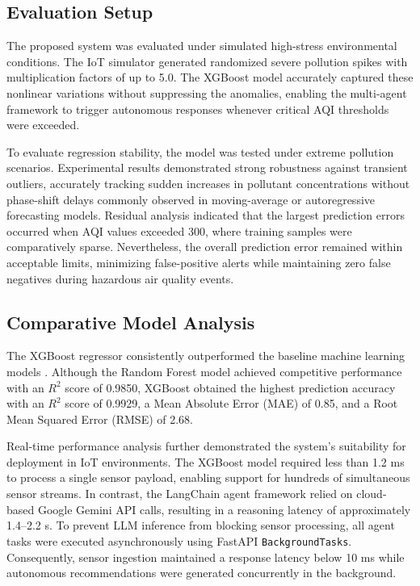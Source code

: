 \documentclass[conference]{IEEEtran}
\begin{document}
\subsection{Evaluation Setup}

The proposed system was evaluated under simulated
high-stress environmental conditions. The IoT simulator
generated randomized severe pollution spikes with
multiplication factors of up to 5.0. The XGBoost model
accurately captured these nonlinear variations without
suppressing the anomalies, enabling the multi-agent
framework to trigger autonomous responses whenever
critical AQI thresholds were exceeded.

To evaluate regression stability, the model was tested under
extreme pollution scenarios. Experimental results
demonstrated strong robustness against transient outliers,
accurately tracking sudden increases in pollutant
concentrations without phase-shift delays commonly
observed in moving-average or autoregressive forecasting
models. Residual analysis indicated that the largest
prediction errors occurred when AQI values exceeded 300,
where training samples were comparatively sparse.
Nevertheless, the overall prediction error remained within
acceptable limits, minimizing false-positive alerts while
maintaining zero false negatives during hazardous air
quality events.

\subsection{Comparative Model Analysis}

The XGBoost regressor consistently outperformed the
baseline machine learning models \cite{b5,b6,b22}. Although the Random
Forest model achieved competitive performance with an
$R^2$ score of 0.9850, XGBoost obtained the highest
prediction accuracy with an $R^2$ score of 0.9929, a Mean
Absolute Error (MAE) of 0.85, and a Root Mean Squared
Error (RMSE) of 2.68.

Real-time performance analysis further demonstrated the
system's suitability for deployment in IoT environments.
The XGBoost model required less than 1.2 ms to process a
single sensor payload, enabling support for hundreds of
simultaneous sensor streams. In contrast, the LangChain
agent framework relied on cloud-based Google Gemini API
calls, resulting in a reasoning latency of approximately
1.4--2.2 s. To prevent LLM inference from blocking sensor
processing, all agent tasks were executed asynchronously
using FastAPI \texttt{BackgroundTasks}. Consequently,
sensor ingestion maintained a response latency below
10 ms while autonomous recommendations were generated
concurrently in the background.
\end{document}
